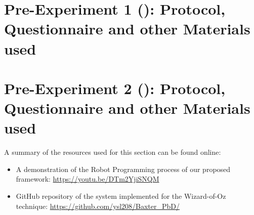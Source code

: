 \chapter{Pre-Experiment 1 (): Protocol, Questionnaire and other Materials used}
\label{app:exp1}
%
%
%

\chapter{Pre-Experiment 2 (): Protocol, Questionnaire and other Materials used}
\label{app:exp2}
A summary of the resources used for this section can be found online:
\begin{itemize}
	\item A demonstration of the Robot Programming process of our proposed framework: \url{https://youtu.be/DTm2YjiSNQM}
	\item GitHub repository of the system implemented for the Wizard-of-Oz technique: \url{https://github.com/ysl208/Baxter_PbD/}
\end{itemize}

%
%


